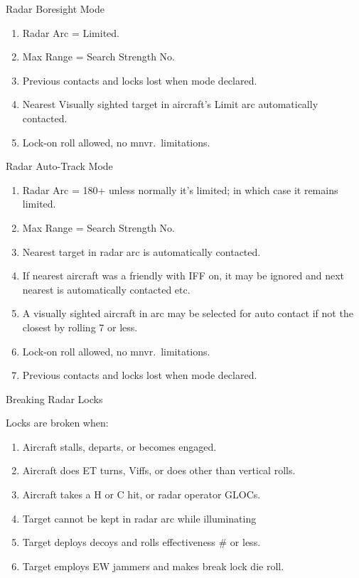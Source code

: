 \begin{table}
\centering
\caption{Radar Boresight Mode}
\medskip
\begin{minipage}{\linewidth}
\begin{enumerate}
    \item Radar Arc = Limited.
    \item Max Range = Search Strength No.
    \item Previous contacts and locks lost when mode declared.
    \item Nearest Visually sighted target in aircraft's Limit arc automatically contacted.
    \item Lock-on roll allowed, no mnvr.\ limitations.
\end{enumerate}
\end{minipage}
\end{table}

\begin{table}
\centering
\caption{Radar Auto-Track Mode}
\medskip
\begin{minipage}{\linewidth}
\begin{enumerate}
    \item Radar Arc = 180+ unless normally it's limited; in which case it remains limited.
    \item Max Range = Search Strength No.
    \item Nearest target in radar arc is automatically contacted.
    \item If nearest aircraft was a friendly with IFF on, it may be ignored and next nearest is automatically contacted etc.
    \item A visually sighted aircraft in arc may be selected for auto contact if not the closest by rolling 7 or less.
    \item Lock-on roll allowed, no mnvr.\ limitations.
    \item Previous contacts and locks lost when mode declared.
\end{enumerate}
\end{minipage}
\end{table}

\begin{table}
\centering
\caption{Breaking Radar Locks}
\medskip
\begin{minipage}{\linewidth}
Locks are broken when:
\begin{enumerate}
    \item Aircraft stalls, departs, or becomes engaged.
    \item Aircraft does ET turns, Viffs, or does other than vertical rolls.
    \item Aircraft takes a H or C hit, or radar operator GLOCs.
    \item Target cannot be kept in radar arc while illuminating
    \item Target deploys decoys and rolls effectiveness \# or less.
    \item Target employs EW jammers and makes break lock die roll.
\end{enumerate}
\end{minipage}
\end{table}


